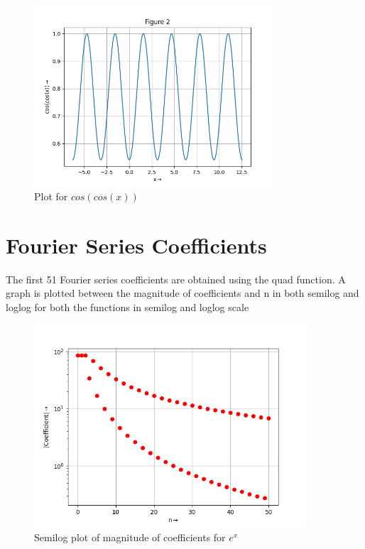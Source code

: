 \documentclass[10pt,a4paper]{article}
\begin{document}
\newline
\begin{figure}[!tbh]
\includegraphics[width = 0.8\textwidth]{1b.png}
\caption{Plot for $cos(cos(x))$}
\end{figure} 


\section{Fourier Series Coefficients}

The first 51 Fourier series coefficients are obtained using the quad function.
A graph is plotted between the magnitude of coefficients and n in both semilog and loglog for both the functions in semilog and loglog scale
\begin{figure}[!tbh]
\includegraphics[width = 0.9\textwidth]{3a1.png}
\caption{Semilog plot of magnitude of coefficients for $e^{x}$}
\end{figure} 
\end{document}
